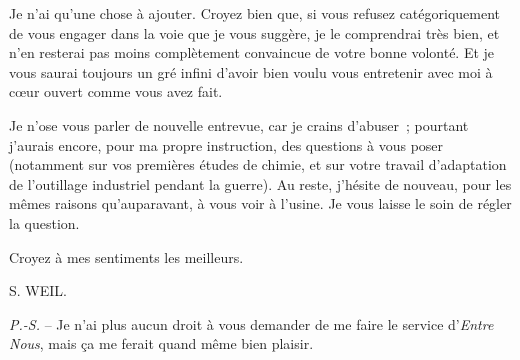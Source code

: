 \documentclass[french,twoside]{book} %
\begin{document}
Je n'ai qu'une chose à ajouter. Croyez bien que, si vous refusez catégoriquement de vous engager dans la voie que je vous suggère, je le comprendrai très bien, et n'en resterai pas moins complètement convaincue de votre bonne volonté. Et je vous saurai toujours un gré infini d'avoir bien voulu vous entretenir avec moi à cœur ouvert comme vous avez fait.\par
Je n'ose vous parler de nouvelle entrevue, car je crains d'abuser ; pourtant j'aurais encore, pour ma propre instruction, des questions à vous poser (notamment sur vos premières études de chimie, et sur votre travail d'adaptation de l'outillage industriel pendant la guerre). Au reste, j'hésite de nouveau, pour les mêmes raisons qu'auparavant, à vous voir à l'usine. Je vous laisse le soin de régler la question.\par
\par
Croyez à mes sentiments les meilleurs.\par
S. WEIL.\par
{\itshape P.-S.} – Je n'ai plus aucun droit à vous demander de me faire le service d'{\itshape Entre Nous}, mais ça me ferait quand même bien plaisir.\par
\end{document}
